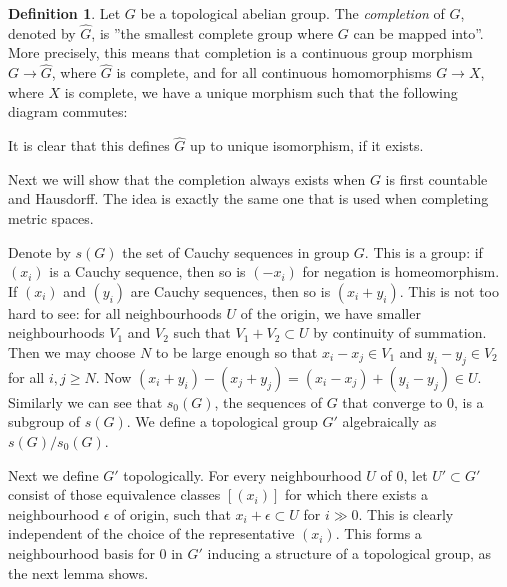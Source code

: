 \documentclass[12pt,a4paper,leqno]{article}
\theoremstyle{plain}
\theoremstyle{definition}
\newtheorem{defn}[theo]{Definition}
\theoremstyle{remark}
\begin{document}
\begin{defn}
Let $G$ be a topological abelian group. The \emph{completion} of $G$, denoted by $\hat G$, is ''the smallest complete group where $G$ can be mapped into''. More precisely, this means that completion is a continuous group morphism $G \to \hat G$, where $\hat G$ is complete, and for all continuous homomorphisms $G \to X$, where $X$ is complete, we have a unique morphism such that the following diagram commutes:

\begin{center}
\end{center}
It is clear that this defines $\hat G$ up to unique isomorphism, if it exists.
\end{defn}

Next we will show that the completion always exists when $G$ is first countable and Hausdorff. The idea is exactly the same one that is used when completing metric spaces.

Denote by $s(G)$ the set of Cauchy sequences in group $G$. This is a group: if $(x_i)$ is a Cauchy sequence, then so is $(-x_i)$ for negation is homeomorphism. If $(x_i)$ and $(y_i)$ are Cauchy sequences, then so is $(x_i + y_i)$. This is not too hard to see: for all neighbourhoods $U$ of the origin, we have smaller neighbourhoods $V_1$ and $V_2$ such that $V_1 + V_2 \subset U$ by continuity of summation. Then we may choose $N$ to be large enough so that $x_i-x_j \in V_1$ and $y_i-y_j \in V_2$ for all $i,j \geq N$. Now $(x_i + y_i) - (x_j + y_j) = (x_i - x_j) + (y_i - y_j) \in U$. Similarly we can see that $s_0(G)$, the sequences of $G$ that converge to 0, is a subgroup of $s(G)$. We define a topological group $G'$ algebraically as $s(G) / s_0(G)$.

Next we define $G'$ topologically. For every neighbourhood $U$ of 0, let $U' \subset G'$ consist of those equivalence classes $[(x_i)]$ for which there exists a neighbourhood $\epsilon$ of origin, such that $x_i + \epsilon \subset U$ for $i \gg 0$. This is clearly independent of the choice of the representative $(x_i)$. This forms a neighbourhood basis for $0$ in $G'$ inducing a structure of a topological group, as the next lemma shows. 
\end{document}
